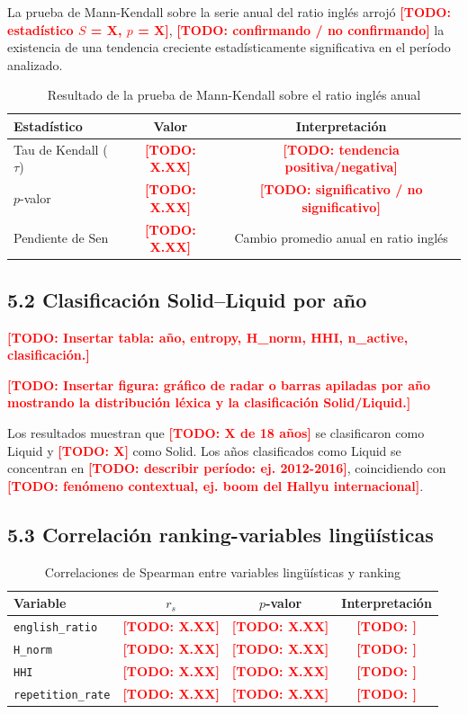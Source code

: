\documentclass[11pt,a4paper]{article}
\newcommand{\todo}[1]{\textcolor{red}{\textbf{[TODO: #1]}}}
\begin{document}
La prueba de Mann-Kendall sobre la serie anual del ratio inglés
arrojó \todo{estadístico $S$ = X, $p$ = X},
\todo{confirmando / no confirmando} la existencia de una tendencia
creciente estadísticamente significativa en el período analizado.

\begin{table}[H]
\centering
\small
\begin{tabular}{lcc}
\toprule
\textbf{Estadístico} & \textbf{Valor} & \textbf{Interpretación} \\
\midrule
Tau de Kendall ($\tau$) & \todo{X.XX} & \todo{tendencia positiva/negativa} \\
$p$-valor              & \todo{X.XX} & \todo{significativo / no significativo} \\
Pendiente de Sen       & \todo{X.XX} & Cambio promedio anual en ratio inglés \\
\bottomrule
\end{tabular}
\caption{Resultado de la prueba de Mann-Kendall sobre el ratio inglés anual}
\end{table}

\subsection*{5.2 Clasificación Solid--Liquid por año}

\todo{Insertar tabla: año, entropy, H\_norm, HHI, n\_active, clasificación.}

\todo{Insertar figura: gráfico de radar o barras apiladas por año mostrando
la distribución léxica y la clasificación Solid/Liquid.}

Los resultados muestran que \todo{X de 18 años} se clasificaron como Liquid
y \todo{X} como Solid.
Los años clasificados como Liquid se concentran en
\todo{describir período: ej. 2012-2016}, coincidiendo con
\todo{fenómeno contextual, ej. boom del Hallyu internacional}.

\subsection*{5.3 Correlación ranking-variables lingüísticas}

\begin{table}[H]
\centering
\small
\begin{tabular}{lccc}
\toprule
\textbf{Variable} & $r_s$ & $p$-valor & \textbf{Interpretación} \\
\midrule
\texttt{english\_ratio}   & \todo{X.XX} & \todo{X.XX} & \todo{} \\
\texttt{H\_norm}          & \todo{X.XX} & \todo{X.XX} & \todo{} \\
\texttt{HHI}              & \todo{X.XX} & \todo{X.XX} & \todo{} \\
\texttt{repetition\_rate} & \todo{X.XX} & \todo{X.XX} & \todo{} \\
\bottomrule
\end{tabular}
\caption{Correlaciones de Spearman entre variables lingüísticas y ranking}
\end{table}
\end{document}
